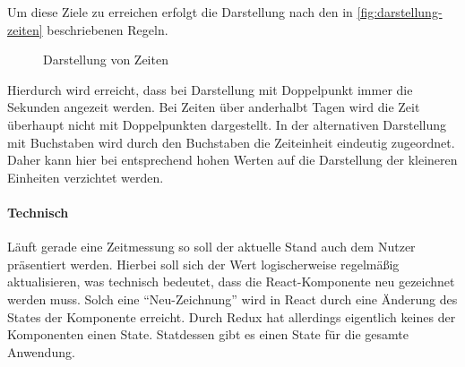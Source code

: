Um diese Ziele zu erreichen erfolgt die Darstellung nach den in \autoref{fig:darstellung-zeiten} beschriebenen Regeln.

\begin{figure}[ht!]
    \centering
    \resizebox{\textwidth}{!}{
        
    }
    \caption{Darstellung von Zeiten}
    \label{fig:darstellung-zeiten}
\end{figure}




Hierdurch wird erreicht, dass bei Darstellung mit Doppelpunkt immer die Sekunden angezeit werden.
Bei Zeiten über anderhalbt Tagen wird die Zeit überhaupt nicht mit Doppelpunkten dargestellt.
In der alternativen Darstellung mit Buchstaben wird durch den Buchstaben die Zeiteinheit eindeutig zugeordnet.
Daher kann hier bei entsprechend hohen Werten auf die Darstellung der kleineren Einheiten verzichtet werden.

\paragraph{Technisch}
Läuft gerade eine Zeitmessung so soll der aktuelle Stand auch dem Nutzer präsentiert werden.
Hierbei soll sich der Wert logischerweise regelmäßig aktualisieren,
was technisch bedeutet, dass die React-Komponente neu gezeichnet werden muss.
Solch eine \enquote{Neu-Zeichnung} wird in React durch eine Änderung des States der Komponente erreicht.
Durch Redux hat allerdings eigentlich keines der Komponenten einen State.
Statdessen gibt es einen State für die gesamte Anwendung.

